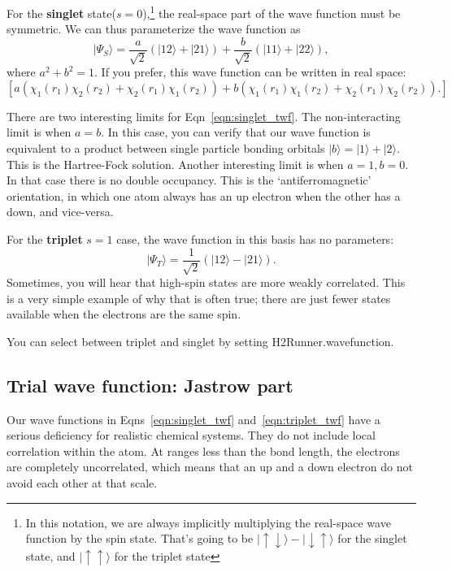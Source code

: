 \documentclass[12pt]{article}
\begin{document}
For the {\bf singlet} state($s=0$),\footnote{In this notation, we are always implicitly multiplying the real-space wave function by the spin state. That's going to be $|\uparrow\downarrow \rangle - |\downarrow\uparrow\rangle$ for the singlet state, and $|\uparrow\uparrow\rangle$ for the triplet state} the real-space part of the wave function must be symmetric. 
We can thus parameterize the wave function as 
\begin{equation}
|\Psi_S\rangle = \frac{a}{\sqrt{2}}\left(|12\rangle + |21\rangle\right) + \frac{b}{\sqrt{2}}\left(|11\rangle + |22\rangle\right),
\label{eqn:singlet_twf}
\end{equation}
where $a^2+b^2=1$. 
If you prefer, this wave function can be written in real space:
\begin{equation}
\left[a(\chi_1(r_1)\chi_2(r_2)+\chi_2(r_1)\chi_1(r_2)) + b(\chi_1(r_1)\chi_1(r_2)+\chi_2(r_1)\chi_2(r_2)).\right]	
\end{equation}


There are two interesting limits for Eqn~\ref{eqn:singlet_twf}. 
The non-interacting limit is when $a=b$. 
In this case, you can verify that our wave function is equivalent to a product between single particle bonding orbitals $|b\rangle=|1\rangle + |2\rangle$.
This is the Hartree-Fock solution.
Another interesting limit is when $a=1,b=0$. 
In that case there is no double occupancy. 
This is the `antiferromagnetic' orientation, in which one atom always has an up electron when the other has a down, and vice-versa.


For the {\bf triplet} $s=1$ case, the wave function in this basis has no parameters:
\begin{equation}
|\Psi_T\rangle = \frac{1}{\sqrt{2}}\left(|12\rangle - |21\rangle\right).
\label{eqn:triplet_twf}
\end{equation}
Sometimes, you will hear that high-spin states are more weakly correlated. 
This is a very simple example of why that is often true; there are just fewer states available when the electrons are the same spin.

You can select between triplet and singlet by setting H2Runner.wavefunction.

\subsection*{Trial wave function: Jastrow part}

Our wave functions in Eqns~\ref{eqn:singlet_twf} and~\ref{eqn:triplet_twf} have a serious deficiency for realistic chemical systems. 
They do not include local correlation within the atom. 
At ranges less than the bond length, the electrons are completely uncorrelated, which means that an up and a down electron do not avoid each other at that scale.
\end{document}
